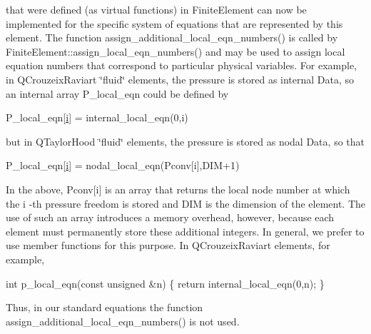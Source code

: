that were defined (as virtual functions) in {\ttfamily Finite\+Element} can now be implemented for the specific system of equations that are represented by this element. The function {\ttfamily assign\+\_\+additional\+\_\+local\+\_\+eqn\+\_\+numbers()} is called by {\ttfamily Finite\+Element\+::assign\+\_\+local\+\_\+eqn\+\_\+numbers()} and may be used to assign local equation numbers that correspond to particular physical variables. For example, in Q\+Crouzeix\+Raviart \char`\"{}fluid\char`\"{} elements, the pressure is stored as \textquotesingle{}internal {\ttfamily Data\textquotesingle{}}, so an internal array {\ttfamily P\+\_\+local\+\_\+eqn} could be defined by 
\begin{DoxyCode}
P\_local\_eqn[\hyperlink{cfortran_8h_adb50e893b86b3e55e751a42eab3cba82}{i}] = internal\_local\_eqn(0,i) 
\end{DoxyCode}
 but in Q\+Taylor\+Hood \char`\"{}fluid\char`\"{} elements, the pressure is stored as nodal {\ttfamily Data}, so that 
\begin{DoxyCode}
P\_local\_eqn[\hyperlink{cfortran_8h_adb50e893b86b3e55e751a42eab3cba82}{i}] = nodal\_local\_eqn(Pconv[i],DIM+1) 
\end{DoxyCode}
 In the above, {\ttfamily Pconv}\mbox{[}i\mbox{]} is an array that returns the local node number at which the {\ttfamily i} -\/th pressure freedom is stored and {\ttfamily D\+IM} is the dimension of the element. The use of such an array introduces a memory overhead, however, because each element must permanently store these additional integers. In general, we prefer to use member functions for this purpose. In Q\+Crouzeix\+Raviart elements, for example, 
\begin{DoxyCode}
\textcolor{keywordtype}{int} p\_local\_eqn(\textcolor{keyword}{const} \textcolor{keywordtype}{unsigned} &n) 
 \{
  \textcolor{keywordflow}{return} internal\_local\_eqn(0,n);
 \}
\end{DoxyCode}
 Thus, in our standard equations the function {\ttfamily assign\+\_\+additional\+\_\+local\+\_\+eqn\+\_\+numbers()} is not used.

